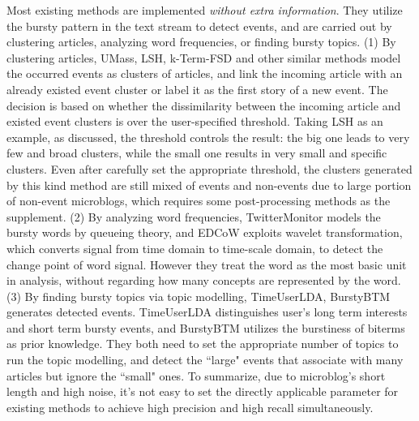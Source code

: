 \documentclass{article}
\begin{document}
Most existing methods are implemented \textit{without extra information}.
They utilize the bursty pattern in the text stream to detect events, and are carried out by  clustering articles\cite{Allan:2000wu,Petrovic:2010uj,Wurzer:2015wq}, analyzing word frequencies\cite{Mathioudakis:2010fc,Weng:2011wz}, or finding bursty topics\cite{Diao:2012wj,Yan:2015wm}. 
(1) By clustering articles, UMass\cite{Allan:2000wu}, LSH\cite{Petrovic:2010uj}, k-Term-FSD\cite{Wurzer:2015wq} and other similar methods model the occurred events as clusters of articles, and link the incoming article with an already existed event cluster or label it as the first story of a new event.
The decision is based on whether the dissimilarity between the incoming article and existed event clusters is over the user-specified threshold. 
Taking LSH as an example, as \cite{Petrovic:2010uj} discussed, the threshold controls the result: the big one leads to very few and broad clusters, while the small one results in very small and specific clusters.
Even after carefully set the appropriate threshold, the clusters generated by this kind method are still mixed of events and non-events due to large portion of non-event microblogs, which requires some post-processing methods as the supplement. 
(2) By analyzing word frequencies, TwitterMonitor\cite{Mathioudakis:2010fc} models the bursty words by queueing theory, and EDCoW\cite{Weng:2011wz} exploits wavelet transformation, which converts signal from time domain to time-scale domain, to detect the change point of word signal. 
However they treat the word as the most basic unit in analysis, without regarding how many concepts are represented by the word.
(3) By finding bursty topics via topic modelling, TimeUserLDA\cite{Diao:2012wj}, BurstyBTM\cite{Yan:2015wm} generates detected events.
TimeUserLDA distinguishes user's long term interests and short term bursty events, and BurstyBTM utilizes the burstiness of biterms as prior knowledge.
They both need to set the appropriate number of topics to run the topic modelling, and detect the ``large" events that associate with many articles but ignore the ``small" ones. 
To summarize, due to microblog's short length and high noise, it's not easy to set the directly applicable parameter for existing methods to achieve high precision and high recall simultaneously.
\end{document}
